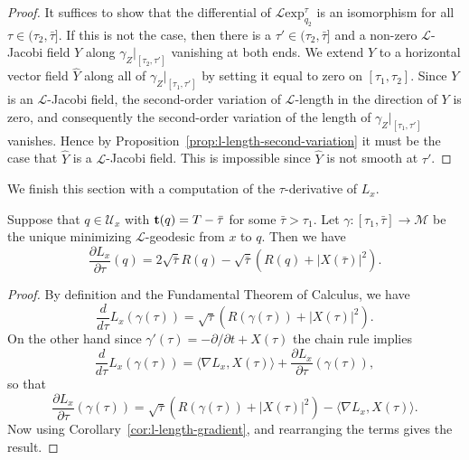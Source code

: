 \begin{proof}
It suffices to show that the differential of ${\mathcal L}\mathrm{exp}_{q_2}^\tau$ is an isomorphism for all $\tau\in
(\tau_2,\bar\tau]$. If this is not the case, then there is a
$\tau'\in (\tau_2,\bar\tau]$ and a non-zero ${\mathcal L}$-Jacobi
field $Y$ along $\gamma_Z|_{[\tau_2,\tau']}$ vanishing at both ends.
We extend $Y$ to a horizontal vector field $\widehat Y$ along all of
$\gamma_Z|_{[\tau_1,\tau']}$  by setting it equal to zero on
$[\tau_1,\tau_2]$. Since $Y$ is an ${\mathcal L}$-Jacobi field, the
second-order variation of ${\mathcal L}$-length in the direction of
$Y$ is zero, and consequently the second-order variation of the
length of $\gamma_Z|_{[\tau_1,\tau']}$ vanishes. Hence by
Proposition~\ref{prop:l-length-second-variation} it must be the case that $\widehat Y$ is a
${\mathcal L}$-Jacobi field. This is impossible since $\widehat Y$
is not smooth at $\tau'$.
\end{proof}



We finish this section with a computation of the $\tau$-derivative
of $L_x$.

\begin{lemma}\label{lem:l-length-tau-derivative}
\label{Ltau}
 Suppose that
$q\in  {\mathcal U}_x$ with ${\bf t}(q)=T-\bar\tau$ for some $\bar\tau>\tau_1$.
Let $\gamma\colon [\tau_1,\bar\tau]\to {\mathcal M}$ be the unique minimizing
${\mathcal L}$-geodesic from $x$ to $q$. Then we have
\begin{equation}\label{Ltaueqn}
\frac{\partial L_x}{\partial \tau}(q)=2\sqrt{\bar\tau}R(
q)-\sqrt{\bar\tau}\left(R( q)+|X(\bar\tau)|^2\right).
\end{equation}
\end{lemma}


\begin{proof}
By definition and the Fundamental Theorem of Calculus, we have
$$\frac{d}{d\tau}L_x(\gamma(\tau))= \sqrt{\tau}\left(R(\gamma(\tau))+|X(\tau)|^2\right).$$
On the other hand since $\gamma'(\tau)=-\partial/\partial t+X(\tau)$
the chain rule implies
$$\frac{d}{d\tau}L_x(\gamma(\tau))=\langle \nabla
L_x,X(\tau)\rangle+\frac{\partial L_x}{\partial
\tau}(\gamma(\tau)),$$ so that
$$\frac{\partial L_x}{\partial \tau}(\gamma(\tau))=\sqrt{\tau}\left(R(\gamma(\tau))+|X(\tau)|^2\right)-\langle\nabla
L_x,X(\tau)\rangle.$$ Now using Corollary~\ref{cor:l-length-gradient}, and rearranging
the terms gives the result.
\end{proof}



